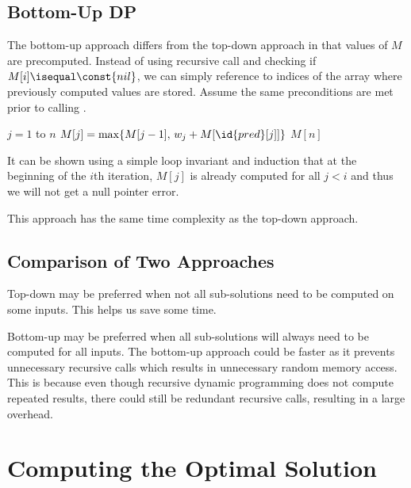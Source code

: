 \subsection{Bottom-Up DP}

The bottom-up approach differs from the top-down approach in that values of $M$ are precomputed. Instead of using recursive call and checking if $M[i] \isequal \const{nil}$, we can simply reference to indices of the array where previously computed values are stored. Assume the same preconditions are met prior to calling .

\begin{codebox}
    \li \For $j = 1$ to $n$ \Do
        \li $M[j] = \max\{M[j-1],\, w_j + M[\id{pred}[j]] \}$
    \End
    \li \Return $M[n]$ 
\end{codebox}

It can be shown using a simple loop invariant and induction that at the beginning of the $i$th iteration, $M[j]$ is already computed for all $j < i$ and thus we will not get a null pointer error.

This approach has the same time complexity as the top-down approach.

\subsection{Comparison of Two Approaches}

Top-down may be preferred when not all sub-solutions need to be computed on some inputs. This helps us save some time.

Bottom-up may be preferred when all sub-solutions will always need to be computed for all inputs. The bottom-up approach could be faster as it prevents unnecessary recursive calls which results in unnecessary random memory access. This is because even though recursive dynamic programming does not compute repeated results, there could still be redundant recursive calls, resulting in a large overhead.

\section{Computing the Optimal Solution}

